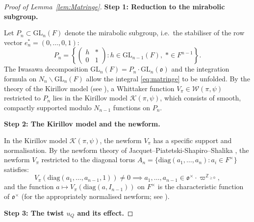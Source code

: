 \documentclass[12pt]{article}
\begin{document}
\begin{proof}[Proof of Lemma~\ref{lem:Matringe}]

\textbf{Step 1: Reduction to the mirabolic subgroup.}

Let $P_n \subset \mathrm{GL}_n(F)$ denote the mirabolic subgroup, i.e.\ the
stabiliser of the row vector $e_n^* = (0,\ldots,0,1)$:
\[
  P_n = \left\{ \begin{pmatrix} h & * \\ 0 & 1 \end{pmatrix} :
    h \in \mathrm{GL}_{n-1}(F),\; * \in F^{n-1} \right\}.
\]
The Iwasawa decomposition $\mathrm{GL}_n(F) = P_n \cdot \mathrm{GL}_n(\mathfrak{o})$
and the integration formula on $N_n\backslash\mathrm{GL}_n(F)$ allow the integral
\eqref{eq:matringe} to be unfolded.  By the theory of the Kirillov model (see
\cite[Proposition~(2.4)]{JPSS83}), a Whittaker function $V_\pi \in
\mathcal{W}(\pi,\psi)$ restricted to $P_n$ lies in the Kirillov model
$\mathcal{K}(\pi,\psi)$, which consists of smooth, compactly supported modulo
$N_{n-1}$ functions on $P_n$.

\textbf{Step 2: The Kirillov model and the newform.}

In the Kirillov model $\mathcal{K}(\pi,\psi)$, the newform $V_\pi$ has a
specific support and normalisation.  By the newform theory of Jacquet--Piatetski-Shapiro--Shalika \cite{JPSS81}, the newform $V_\pi$ restricted to the
diagonal torus $A_n = \{\mathrm{diag}(a_1,\ldots,a_n) : a_i \in F^\times\}$
satisfies:
\begin{equation}\label{eq:newform-support}
  V_\pi(\mathrm{diag}(a_1,\ldots,a_{n-1},1)) \neq 0 \implies
  a_1,\ldots,a_{n-1} \in \mathfrak{o}^\times \cdot \varpi^{\mathbb{Z}_{\geq 0}},
\end{equation}
and the function $a \mapsto V_\pi(\mathrm{diag}(a,I_{n-1}))$ on $F^\times$ is the
characteristic function of $\mathfrak{o}^\times$ (for the appropriately normalised
newform; see \cite{Miyauchi14}).

\textbf{Step 3: The twist $u_Q$ and its effect.}


\end{proof}
\end{document}
